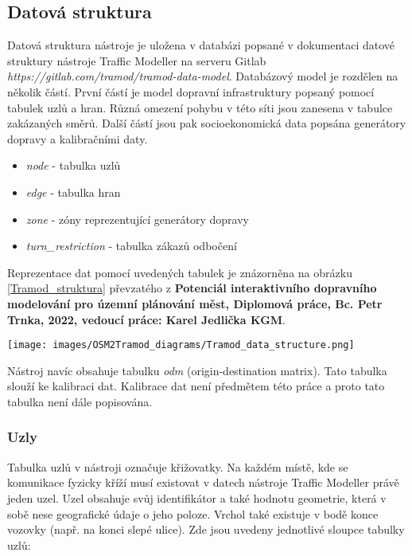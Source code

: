 \subsection{Datová struktura}

Datová struktura nástroje je uložena v databázi popsané v dokumentaci datové struktury nástroje Traffic Modeller na serveru Gitlab \textit{https://gitlab.com/tramod/tramod-data-model}. Databázový model je rozdělen na několik částí. První částí je model dopravní infrastruktury popsaný pomocí tabulek uzlů a hran. Různá omezení pohybu v této síti jsou zanesena v tabulce zakázaných směrů. Další částí jsou pak socioekonomická data popsána generátory dopravy a kalibračními daty.

\begin{itemize}
  \item \textit{node} - tabulka uzlů
  \item \textit{edge} - tabulka hran
  \item \textit{zone} - zóny reprezentující generátory dopravy
  \item \textit{turn\_restriction} - tabulka zákazů odbočení
\end{itemize}

Reprezentace dat pomocí uvedených tabulek je znázorněna na obrázku \ref{Tramod_struktura} převzatého z \textbf{Potenciál interaktivního dopravního modelování pro územní plánování měst, Diplomová práce, Bc. Petr Trnka, 2022, vedoucí práce: Karel Jedlička KGM}. 

\begin{sidewaysfigure}[htbp]
\centering
\texttt{[image: images/OSM2Tramod\_diagrams/Tramod\_data\_structure.png]}
\caption{Grafické schéma TraMod}
\label{Tramod_struktura}
\end{sidewaysfigure}

Nástroj navíc obsahuje tabulku \textit{odm} (origin-destination matrix). Tato tabulka slouží ke kalibraci dat. Kalibrace dat není předmětem této práce a proto tato tabulka není dále popisována. 

\subsubsection{Uzly}

Tabulka uzlů v nástroji označuje křižovatky. Na každém místě, kde se komunikace fyzicky kříží musí existovat v datech nástroje Traffic Modeller právě jeden uzel. Uzel obsahuje svůj identifikátor a také hodnotu geometrie, která v sobě nese geografické údaje o jeho poloze. Vrchol také existuje v bodě konce vozovky (např. na konci slepé ulice). Zde jsou uvedeny jednotlivé sloupce tabulky uzlů: 

